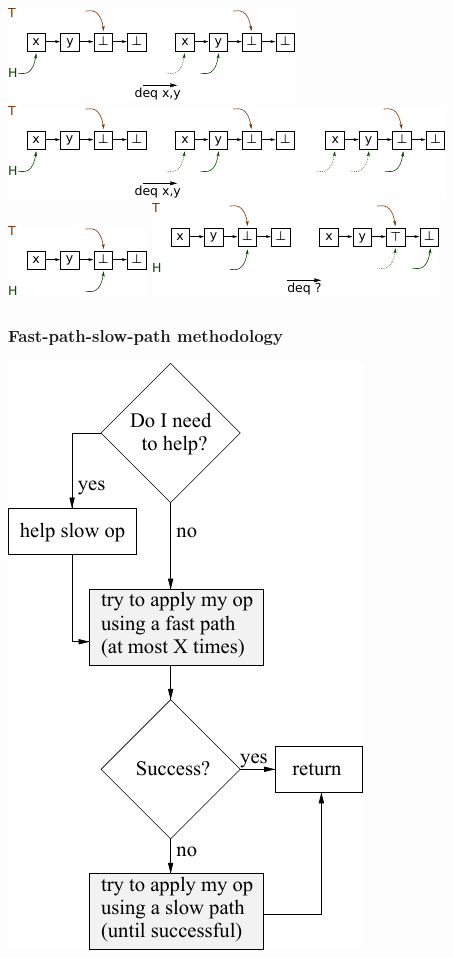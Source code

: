 \documentclass[10pt,a4paper]{beamer}
\begin{document}
\begin{frame}[fragile]
\begin{overprint}
   \includegraphics[scale=1.6]{img/q5.pdf}
   \includegraphics[scale=1.6]{img/q6.pdf}
   \includegraphics[scale=1.6]{img/q7.pdf}
   \includegraphics[scale=1.6]{img/q8.pdf}
\end{overprint}
\end{frame}

\begin{frame}
  \frametitle{Fast-path-slow-path methodology}
  \center
  \includegraphics[scale=0.8]{../synthese/img/fpsp.pdf}
\end{frame}
\end{document}
